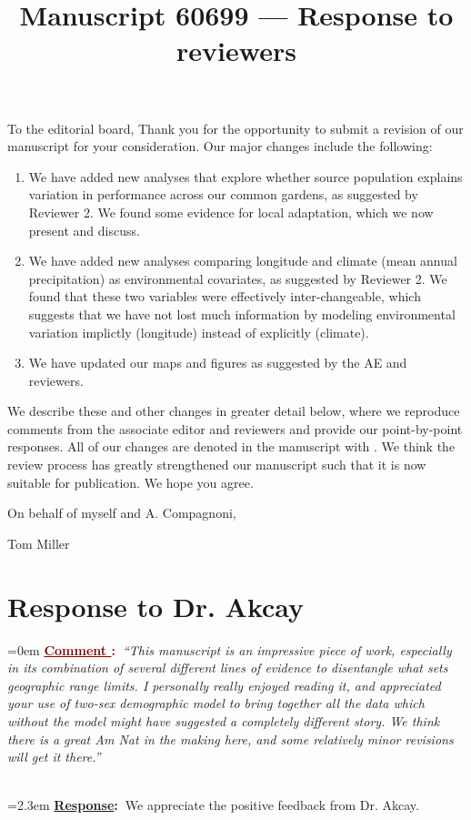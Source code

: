 \documentclass[12pt]{article}
\newcounter{cN}
\newcommand{\comment}[1]{
	\vspace{2em}
	\refstepcounter{cN} %
	\noindent \hangindent=0em \textbf{\textcolor{Maroon}{\uline{Comment \thecN}:~}}\emph{``#1''}
	}
\newcommand{\response}[1]{
	\\[0.25em]
	\hangindent=2.3em \textbf{\textcolor{NavyBlue}{\uline{Response}:~}}#1
	}
\newcommand{\revise}[1]{{\color{Mahogany}{#1}}}
\begin{document}
\title{Manuscript 60699 --- Response to reviewers}

\maketitle
\noindent To the editorial board,
Thank you for the opportunity to submit a revision of our manuscript for your consideration. Our major changes include the following:
\begin{enumerate}
	\item We have added new analyses that explore whether source population explains variation in performance across our common gardens, as suggested by Reviewer 2. We found some evidence for local adaptation, which we now present and discuss. 
	\item We have added new analyses comparing longitude and climate (mean annual precipitation) as environmental covariates, as suggested by Reviewer 2. We found that these two variables were effectively inter-changeable, which suggests that we have not lost much information by modeling environmental variation implictly (longitude) instead of explicitly (climate).
	\item We have updated our maps and figures as suggested by the AE and reviewers.
\end{enumerate}

We describe these and other changes in greater detail below, where we reproduce comments from the associate editor and reviewers and provide our point-by-point responses. 
All of our changes are denoted in the manuscript with \revise{Mahogany font}.
We think the review process has greatly strengthened our manuscript such that it is now suitable for publication.
We hope you agree. 

\vspace{2em}
\hfill On behalf of myself and A. Compagnoni,

\hfill Tom Miller
\newpage

\section{Response to Dr. Akcay}
\vspace{-2em}

\comment{This manuscript is an impressive piece of work, especially in its combination of several different lines of evidence to disentangle what sets geographic range limits. I personally really enjoyed reading it, and appreciated your use of two-sex demographic model to bring together all the data which without the model might have suggested a completely different story. We think there is a great Am Nat in the making here, and some relatively minor revisions will get it there.}
\response{We appreciate the positive feedback from Dr. Akcay.}
\end{document}
